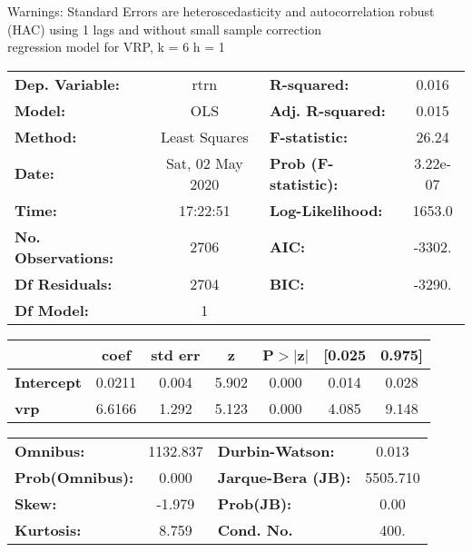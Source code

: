 Warnings: \newline
 [1] Standard Errors are heteroscedasticity and autocorrelation robust (HAC) using 1 lags and without small sample correction\\ 

regression model for VRP, k = 6 h = 1\begin{center}
\begin{tabular}{lclc}
\toprule
\textbf{Dep. Variable:}    &       rtrn       & \textbf{  R-squared:         } &     0.016   \\
\textbf{Model:}            &       OLS        & \textbf{  Adj. R-squared:    } &     0.015   \\
\textbf{Method:}           &  Least Squares   & \textbf{  F-statistic:       } &     26.24   \\
\textbf{Date:}             & Sat, 02 May 2020 & \textbf{  Prob (F-statistic):} &  3.22e-07   \\
\textbf{Time:}             &     17:22:51     & \textbf{  Log-Likelihood:    } &    1653.0   \\
\textbf{No. Observations:} &        2706      & \textbf{  AIC:               } &    -3302.   \\
\textbf{Df Residuals:}     &        2704      & \textbf{  BIC:               } &    -3290.   \\
\textbf{Df Model:}         &           1      & \textbf{                     } &             \\
\bottomrule
\end{tabular}
\begin{tabular}{lcccccc}
                   & \textbf{coef} & \textbf{std err} & \textbf{z} & \textbf{P$> |$z$|$} & \textbf{[0.025} & \textbf{0.975]}  \\
\midrule
\textbf{Intercept} &       0.0211  &        0.004     &     5.902  &         0.000        &        0.014    &        0.028     \\
\textbf{vrp}       &       6.6166  &        1.292     &     5.123  &         0.000        &        4.085    &        9.148     \\
\bottomrule
\end{tabular}
\begin{tabular}{lclc}
\textbf{Omnibus:}       & 1132.837 & \textbf{  Durbin-Watson:     } &    0.013  \\
\textbf{Prob(Omnibus):} &   0.000  & \textbf{  Jarque-Bera (JB):  } & 5505.710  \\
\textbf{Skew:}          &  -1.979  & \textbf{  Prob(JB):          } &     0.00  \\
\textbf{Kurtosis:}      &   8.759  & \textbf{  Cond. No.          } &     400.  \\
\bottomrule
\end{tabular}
\end{center}

